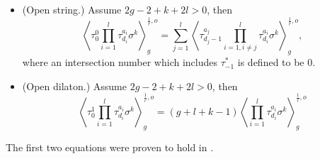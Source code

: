 \documentclass[11pt]{amsart}
\theoremstyle{definition}
\theoremstyle{remark}
\newcommand{\<}{\left<}
\renewcommand{\>}{\right>}
\numberwithin{equation}{section}
\begin{document}
\begin{itemize}
\begin{equation}
\begin{split}
\hspace{-0.1cm}\left\langle \tau_0^{r-2-a}\prod_{i\in J_2}\tau^{a_i}_{d_i}\sigma^k\right\rangle^{\frac{1}{r},o}_1\\
&+\hspace{-0.1cm}\sum_{\substack{J_1 \sqcup J_2 =  [l]\setminus\{1\} \\ k_1+k_2=k}} \hspace{-0.1cm} \binom{k}{k_1}\left\langle \tau^{a_{1}}_{d_{1}}\prod_{i \in J_1} \tau^{a_i}_{d_i}\sigma^{k_1}\right\rangle^{\frac{1}{r},o}_0 \hspace{-0.1cm}\left\langle \prod_{i \in J_2} \tau^{a_i}_{d_i} \sigma^{k_2+1}\right\rangle^{\frac{1}{r}, o}_1\\
&+\frac{1}{2}\left\langle \prod_{i\in [l]}\tau^{a_i}_{d_i}\sigma^{k+1}\right\rangle^{\frac{1}{r},o}_0.
    \end{split}
\end{equation}\label{eq:g=1_trr}
\item[(d)](Open string.)
Assume $2g-2+k+2l>0$, then %
\begin{equation}\label{eq:open_string}
\left\langle\tau^0_0\prod_{i=1}^l\tau^{a_i}_{d_i}\sigma^k\right\rangle^{\frac{1}{r},o}_g=\sum_{j=1}^l\left\langle\tau^{a_j}_{d_j-1}\prod_{i=1,i\neq j}^l\tau^{a_i}_{d_i}\sigma^k\right\rangle^{\frac{1}{r},o}_g,
\end{equation}
where an intersection number which includes $\tau^*_{-1}$ is defined to be $0.$
\item[(e)]%
(Open dilaton.)
Assume %
$2g-2+k+2l>0$, %
then
\begin{equation}\label{eq:open_dilaton}
\left\langle\tau^1_0\prod_{i=1}^l\tau^{a_i}_{d_i}\sigma^k\right\rangle^{\frac{1}{r},o}_g=(g+l+k-1)\left\langle\prod_{i=1}^l\tau^{a_i}_{d_i}\sigma^k\right\rangle^{\frac{1}{r},o}_g
\end{equation}
\end{itemize}
The %
first two equations were proven to hold in \cite{BCT2}.
\end{document}
